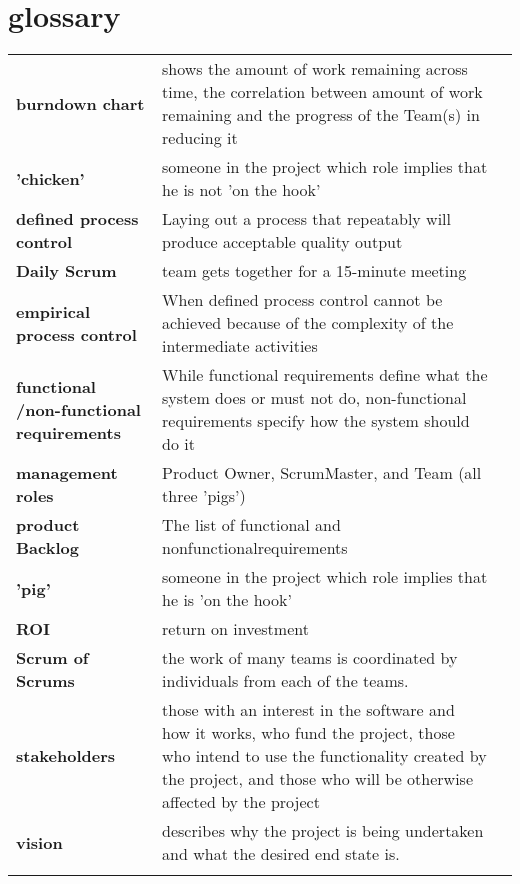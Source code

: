 \section*{glossary}

\begin{table}[H]
  \begin{tabular}{lll}
    \textbf{burndown chart} &  shows the amount of work remaining across time, the correlation between amount of work remaining and the progress of the Team(s) in reducing it\\
    \textbf{'chicken'} &  someone in the project which role implies that he is not 'on the hook'\\
    \textbf{defined process control} &  Laying out a process that repeatably will produce acceptable quality output\\
    \textbf{Daily Scrum} & team gets together for a 15-minute meeting\\
    \textbf{empirical process control} &  When defined process control cannot be achieved because of the complexity of the intermediate activities\\
    \textbf{functional /non-functional requirements} &  While functional requirements define what the system does or must not do, non-functional requirements specify how the system should do it\\
    \textbf{management roles} & Product Owner, ScrumMaster, and Team (all three 'pigs')\\
    \textbf{product Backlog} & The list of functional and nonfunctionalrequirements\\
    \textbf{'pig'} & someone in the project which role implies that he is 'on the hook'\\
    \textbf{ROI} &  return on investment\\
    \textbf{Scrum of Scrums} &  the work of many teams is coordinated by individuals from each of the teams.\\
    \textbf{stakeholders} &  those with an interest in the software and how it works, who fund the project, those who intend to use the functionality created by the project, and those who will be otherwise affected by the project\\
    \textbf{vision} &  describes why the project is being undertaken and what the desired end state is.\\
   & 
  \end{tabular}
\end{table}